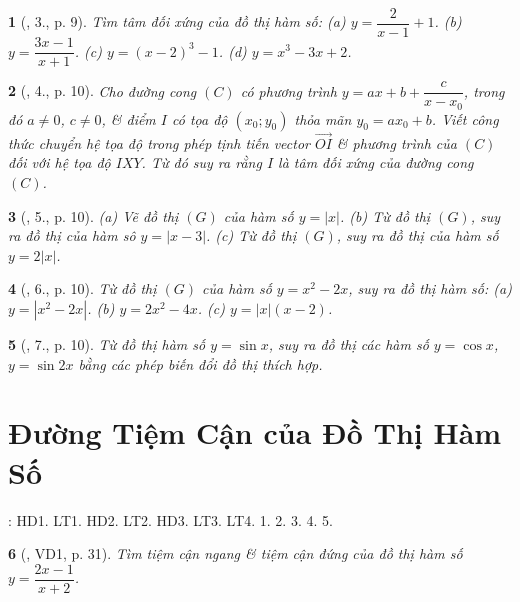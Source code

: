 \documentclass{article}
\newtheorem{baitoan}{}
\begin{document}
\begin{baitoan}[\cite{TLCT_giai_tich_12}, 3., p. 9]
	Tìm tâm đối xứng của đồ thị hàm số: (a) $y = \dfrac{2}{x - 1} + 1$. (b) $y = \dfrac{3x - 1}{x + 1}$. (c) $y = (x - 2)^3 - 1$. (d) $y = x^3 - 3x + 2$.
\end{baitoan}

\begin{baitoan}[\cite{TLCT_giai_tich_12}, 4., p. 10]
	Cho đường cong $(C)$ có phương trình $y = ax + b + \dfrac{c}{x - x_0}$, trong đó $a\ne 0$, $c\ne 0$, \& điểm $I$ có tọa độ $(x_0;y_0)$ thỏa mãn $y_0 = ax_0 + b$. Viết công thức chuyển hệ tọa độ trong phép tịnh tiến vector $\overrightarrow{OI}$ \& phương trình của $(C)$ đối với hệ tọa độ $IXY$. Từ đó suy ra rằng $I$ là tâm đối xứng của đường cong $(C)$.
\end{baitoan}

\begin{baitoan}[\cite{TLCT_giai_tich_12}, 5., p. 10]
	(a) Vẽ đồ thị $(G)$ của hàm số $y = |x|$. (b) Từ đồ thị $(G)$, suy ra đồ thị của hàm sô $y = |x - 3|$. (c) Từ đồ thị $(G)$, suy ra đồ thị của hàm số $y = 2|x|$.
\end{baitoan}

\begin{baitoan}[\cite{TLCT_giai_tich_12}, 6., p. 10]
	Từ đồ thị $(G)$ của hàm số $y = x^2 - 2x$, suy ra đồ thị hàm số: (a) $y = |x^2 - 2x|$. (b) $y = 2x^2 - 4x$. (c) $y = |x|(x - 2)$.
\end{baitoan}

\begin{baitoan}[\cite{TLCT_giai_tich_12}, 7., p. 10]
	Từ đồ thị hàm số $y = \sin x$, suy ra đồ thị các hàm số $y = \cos x$, $y = \sin 2x$ bằng các phép biến đổi đồ thị thích hợp.
\end{baitoan}


\section{Đường Tiệm Cận của Đồ Thị Hàm Số}
\cite[Chap. I, \S3, pp. 21--27]{SGK_Toan_12_CD_tap_1}: HD1. LT1. HD2. LT2. HD3. LT3. LT4. 1. 2. 3. 4. 5.

\begin{baitoan}[\cite{SGK_Toan_12_giai_tich_nang_cao}, VD1, p. 31]
	Tìm tiệm cận ngang \& tiệm cận đứng của đồ thị hàm số $y = \dfrac{2x - 1}{x + 2}$.
\end{baitoan}
\end{document}
